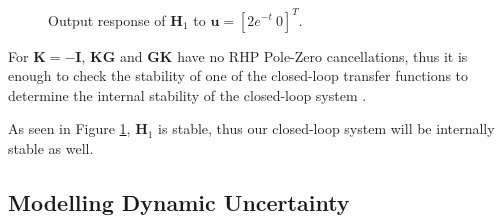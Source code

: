 \begin{figure}[h!]
    \centering
    \scalebox{0.6}{
    \begin{tikzpicture}
        
    \end{tikzpicture}}
    \caption{Output response of $\bm{H}_1$ to $\bm{u} = \left[2e^{-t}\: 0\right]^T$.}
    \label{Tf1}
\end{figure}
For $\bm{K} = -\bm{I}$, $\bm{KG}$ and $\bm{GK}$ have no RHP Pole-Zero cancellations, thus it is enough to check the stability of one of the closed-loop transfer functions to determine the internal stability of the closed-loop system \cite{Zho99}.

As seen in Figure \ref{Tf1}, $\bm{H}_1$ is stable, thus our closed-loop system will be internally stable as well.
\subsection{Modelling Dynamic Uncertainty}

